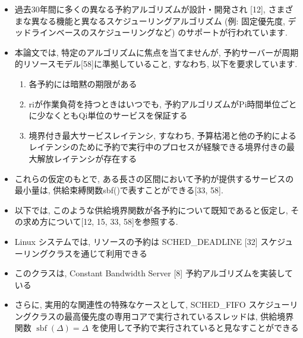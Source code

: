 \begin{frame}{}
    \begin{itemize}
        \item 過去30年間に多くの異なる予約アルゴリズムが設計・開発され [12], さまざまな異なる機能と異なるスケジューリングアルゴリズム (例: 固定優先度, デッドラインベースのスケジューリングなど) のサポートが行われています.
    \end{itemize}
\end{frame}

\begin{frame}{}
    \begin{itemize}
        \item 本論文では, 特定のアルゴリズムに焦点を当てませんが, 予約サーバーが周期的リソースモデル[58]に準拠していること, すなわち, 以下を要求しています.
        \begin{enumerate}
            \item 各予約には暗黙の期限がある
            \item riが作業負荷を持つときはいつでも, 予約アルゴリズムがPi時間単位ごとに少なくともQi単位のサービスを保証する
            \item 境界付き最大サービスレイテンシ, すなわち, 予算枯渇と他の予約によるレイテンシのために予約で実行中のプロセスが経験できる境界付きの最大解放レイテンシが存在する
        \end{enumerate}
        \item これらの仮定のもとで, ある長さの区間において予約が提供するサービスの最小量は, 供給束縛関数sbf()で表すことができる[33, 58].
        \item 以下では, このような供給境界関数が各予約について既知であると仮定し, その求め方について[12, 15, 33, 58]を参照する.
    \end{itemize}
\end{frame}

\begin{frame}{}
    \begin{itemize}
        \item Linux システムでは, リソースの予約は SCHED\_DEADLINE [32] スケジューリングクラスを通じて利用できる
        \item このクラスは, Constant Bandwidth Server [8] 予約アルゴリズムを実装している
        \item さらに, 実用的な関連性の特殊なケースとして, SCHED\_FIFO スケジューリングクラスの最高優先度の専用コアで実行されているスレッドは, 供給境界関数 $\operatorname{sbf}(\Delta)=\Delta$ を使用して予約で実行されていると見なすことができる
    \end{itemize}
\end{frame}

